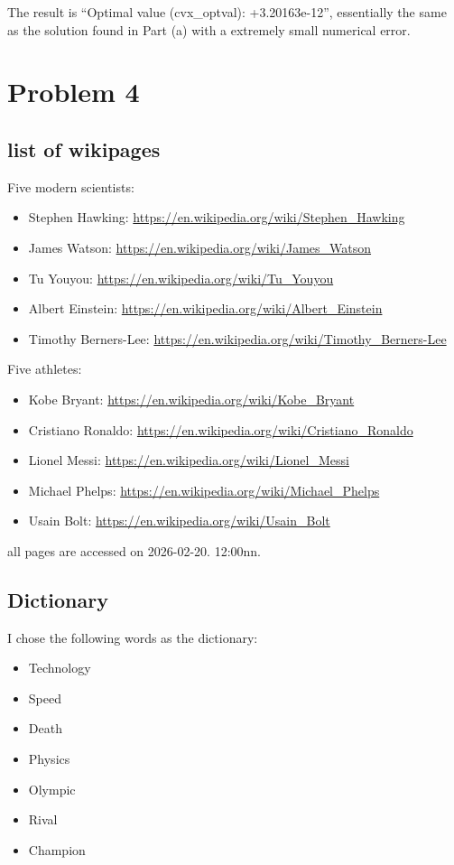 \documentclass{article}
\begin{document}
    \noindent The result is ``Optimal value (cvx\_optval): +3.20163e-12'', essentially the same as the solution found in Part (a) with a extremely small numerical error.

    \section{Problem 4}
    \subsection{list of wikipages}
    Five modern scientists:
    \begin{itemize}
        \item Stephen Hawking: \url{https://en.wikipedia.org/wiki/Stephen_Hawking}
        \item James Watson: \url{https://en.wikipedia.org/wiki/James_Watson}
        \item Tu Youyou: \url{https://en.wikipedia.org/wiki/Tu_Youyou}
        \item Albert Einstein: \url{https://en.wikipedia.org/wiki/Albert_Einstein}
        \item Timothy Berners-Lee: \url{https://en.wikipedia.org/wiki/Timothy_Berners-Lee}
    \end{itemize}

    \noindent Five athletes:
    \begin{itemize}
        \item Kobe Bryant: \url{https://en.wikipedia.org/wiki/Kobe_Bryant}
        \item Cristiano Ronaldo: \url{https://en.wikipedia.org/wiki/Cristiano_Ronaldo}
        \item Lionel Messi: \url{https://en.wikipedia.org/wiki/Lionel_Messi}
        \item Michael Phelps: \url{https://en.wikipedia.org/wiki/Michael_Phelps}
        \item Usain Bolt: \url{https://en.wikipedia.org/wiki/Usain_Bolt}
    \end{itemize}
    
    \noindent all pages are accessed on 2026-02-20. 12:00nn.
    \subsection{Dictionary}
    I chose the following words as the dictionary:
    \begin{itemize}
        \item Technology
        \item Speed
        \item Death
        \item Physics
        \item Olympic
        \item Rival
        \item Champion
    \end{itemize}
\end{document}
